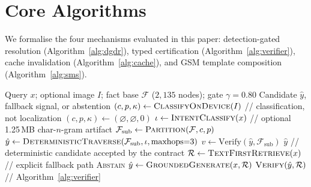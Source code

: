 \documentclass[11pt,a4paper]{article}
\begin{document}
\section{Core Algorithms}
\label{sec:algorithms}

We formalise the four mechanisms evaluated in this paper: detection-gated resolution (Algorithm~\ref{alg:dgdr}), typed certification (Algorithm~\ref{alg:verifier}), cache invalidation (Algorithm~\ref{alg:cache}), and GSM template composition (Algorithm~\ref{alg:sms}).

\begin{algorithm}[t]
\caption{Detection-Gated Deterministic Resolution}
\label{alg:dgdr}
\begin{algorithmic}[1]
\REQUIRE Query $x$; optional image $I$; fact base $\mathcal{F}$ ($2{,}135$ nodes); gate $\gamma{=}0.80$
\ENSURE Candidate $\hat{y}$, fallback signal, or abstention
    \STATE $(c, p, \kappa) \gets \textsc{ClassifyOnDevice}(I)$ \hfill // classification, not localization
\ELSE
    \STATE $(c,p,\kappa) \gets (\varnothing,\varnothing,0)$
\ENDIF
\STATE $\iota \gets \textsc{IntentClassify}(x)$ \hfill // optional 1.25\,MB char-$n$-gram artifact
\IF{$\kappa \ge \gamma$}
    \STATE $\mathcal{F}_{\text{sub}} \gets \textsc{Partition}(\mathcal{F}, c, p)$
    \STATE $\hat{y} \gets \textsc{DeterministicTraverse}(\mathcal{F}_{\text{sub}}, \iota, \text{maxhops}{=}3)$
        \STATE $v \gets \mathrm{Verify}(\hat{y},\mathcal{F}_{\mathrm{sub}})$
            \RETURN $\hat{y}$ \hfill // deterministic candidate accepted by the contract
        \ENDIF
    \ENDIF
\ENDIF
\STATE $\mathcal{R} \gets \textsc{TextFirstRetrieve}(x)$ \hfill // explicit fallback path
    \RETURN \textsc{Abstain}
\ENDIF
\STATE $\hat{y} \gets \textsc{GroundedGenerate}(x, \mathcal{R})$
\RETURN $\textsc{Verify}(\hat{y},\mathcal{R})$ \hfill // Algorithm~\ref{alg:verifier}
\end{algorithmic}
\end{algorithm}
\end{document}
